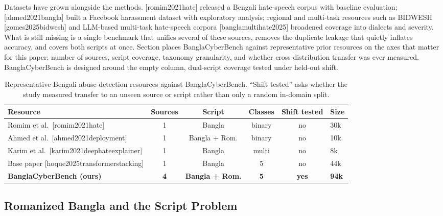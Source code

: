 \documentclass[11pt,a4paper]{article}
\def\dset#1{#1}%
\def\citet#1{[#1]}%
\def\citep#1{[#1]}%
\def\Cref#1{Section}%
\def\textsc#1{#1}%
\providecommand{\dset}[1]{\textsc{#1}}
\newcommand{\bench}{BanglaCyberBench}
\begin{document}
Datasets have grown alongside the methods. \citet{romim2021hate} released a Bengali hate-speech corpus with baseline evaluation; \citet{ahmed2021bangla} built a Facebook harassment dataset with exploratory analysis; regional and multi-task resources such as \dset{BIDWESH} \citep{gomes2025bidwesh} and LLM-based multi-task hate-speech corpora \citep{banglamultihate2025} broadened coverage into dialects and severity. What is still missing is a single benchmark that unifies several of these sources, removes the duplicate leakage that quietly inflates accuracy, and covers both scripts at once. \Cref{tab:priordata} places \bench{} against representative prior resources on the axes that matter for this paper: number of sources, script coverage, taxonomy granularity, and whether cross-distribution transfer was ever measured. \bench{} is designed around the empty column, dual-script coverage tested under held-out shift.

\begin{table}[!htbp]
\centering
\caption{Representative Bengali abuse-detection resources against \bench{}. ``Shift tested'' asks whether the study measured transfer to an unseen source or script rather than only a random in-domain split.}
\label{tab:priordata}
\small
\begin{tabularx}{\textwidth}{@{}lcccc>{\raggedright\arraybackslash}X@{}}
\toprule
\textbf{Resource} & \textbf{Sources} & \textbf{Script} & \textbf{Classes} & \textbf{Shift tested} & \textbf{Size} \\
\midrule
Romim et al.\ \citep{romim2021hate} & 1 & Bangla & binary & no & 30k \\
Ahmed et al.\ \citep{ahmed2021deployment} & 1 & Bangla + Rom. & binary & no & 10k \\
Karim et al.\ \citep{karim2021deephateexplainer} & 1 & Bangla & multi & no & 8k \\
Base paper \citep{hoque2025transformerstacking} & 1 & Bangla & 5 & no & 44k \\
\textbf{\bench{} (ours)} & \textbf{4} & \textbf{Bangla + Rom.} & \textbf{5} & \textbf{yes} & \textbf{94k} \\
\bottomrule
\end{tabularx}
\end{table}

\subsection{Romanized Bangla and the Script Problem}
\label{sec:rw-script}
\end{document}
